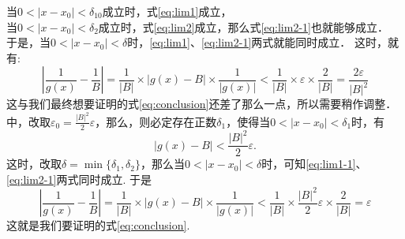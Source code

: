 当$0<|x-x_0|<\delta_{10}$成立时，式\eqref{eq:lim1}成立，\\
当$0<|x-x_0|<\delta_2$成立时，式\eqref{eq:lim2}成立，那么式\eqref{eq:lim2-1}也就能够成立．\\
于是，当$0<|x-x_0|<\delta$时，\eqref{eq:lim1}、\eqref{eq:lim2-1}两式就能同时成立．
这时，就有:
        \begin{equation}
            \left|\frac{1}{g(x)}-\frac{1}{B}\right|=\frac{1}{|B|}\times|g(x)-B|\times\frac{1}{|g(x)|}
            <\frac{1}{|B|}\times \varepsilon \times \frac{2}{|B|}=\frac{2\varepsilon}{|B|^2}
        \end{equation}
这与我们最终想要证明的式\eqref{eq:conclusion}还差了那么一点，所以需要稍作调整．\\
中，改取$\varepsilon_0=\frac{|B|^2}{2}\varepsilon$，那么，则必定存在正数$\delta_1$，使得当$0<|x-x_0|<\delta_1$时，有
\begin{equation}
    |g(x)-B|<\frac{|B|^2}{2}\varepsilon.\label{eq:lim1-1}
\end{equation}
这时，改取$\delta=\min\{\delta_{1},\delta_2\}$，那么当$0<|x-x_0|<\delta$时，可知\eqref{eq:lim1-1}、\eqref{eq:lim2-1}两式同时成立.
于是
\begin{equation}
    \left|\frac{1}{g(x)}-\frac{1}{B}\right|=\frac{1}{|B|}\times|g(x)-B|\times\frac{1}{|g(x)|}
    <\frac{1}{|B|}\times \frac{|B|^2}{2}\varepsilon \times \frac{2}{|B|}=\varepsilon
\end{equation}
这就是我们要证明的式\eqref{eq:conclusion}.



